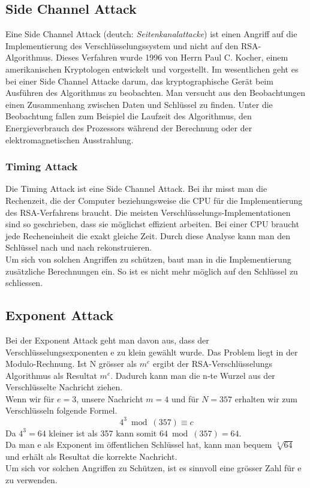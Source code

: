 %
\subsection{Side Channel Attack}
Eine Side Channel Attack (deutch: \textit{Seitenkanalattacke}) ist einen Angriff auf die Implementierung des Verschlüsselungssystem und nicht auf den RSA-Algorithmus. Dieses Verfahren wurde 1996 von Herrn Paul C. Kocher, einem amerikanischen Kryptologen entwickelt und vorgestellt.
Im wesentlichen geht es bei einer Side Channel Attacke darum, das kryptographische Gerät beim Ausführen des Algorithmus zu beobachten.
Man versucht aus den Beobachtungen einen Zusammenhang zwischen Daten und Schlüssel zu finden.
Unter die Beobachtung fallen zum Beispiel die Laufzeit des Algorithmus, den Energieverbrauch des Prozessors während der Berechnung oder der elektromagnetischen Ausstrahlung.
%
\subsubsection{Timing Attack}
Die Timing Attack ist eine Side Channel Attack. 
Bei ihr misst man die Rechenzeit, die der Computer beziehungsweise die CPU für die Implementierung des RSA-Verfahrens braucht. Die meisten Verschlüsselungs-Implementationen sind so geschrieben, dass sie möglichst effizient arbeiten. Bei einer CPU braucht jede Recheneinheit die exakt gleiche Zeit. Durch diese Analyse kann man den Schlüssel nach und nach rekonstruieren.\\
%
Um sich von solchen Angriffen zu schützen, baut man in die Implementierung zusätzliche Berechnungen ein. So ist es nicht mehr möglich auf den Schlüssel zu schliessen.
%
%
\subsection{Exponent Attack}
Bei der Exponent Attack geht man davon aus, dass der Verschlüsselungsexponenten e zu klein gewählt wurde. Das Problem liegt in der Modulo-Rechnung. Ist N grösser als $m^e$ ergibt der RSA-Verschlüsselungs Algorithmus als Resultat $m^e$. Dadurch kann man die n-te Wurzel aus der Verschlüsselte Nachricht ziehen. \\
Wenn wir für $e = 3$, unsere Nachricht $m = 4$ und für $N = 357$ erhalten wir zum Verschlüsseln folgende Formel.
\begin{equation*}
  4^3 \bmod(357) \equiv c
\end{equation*}
Da $4^3 = 64$ kleiner ist als 357 kann somit $64 \bmod(357) = 64$.\\
Da man e als Exponent im öffentlichen Schlüssel hat, kann man bequem $\sqrt[3]{64}$ und erhält als Resultat die korrekte Nachricht.\\
%
Um sich vor solchen Angriffen zu Schützen, ist es sinnvoll eine grösser Zahl für e zu verwenden.
